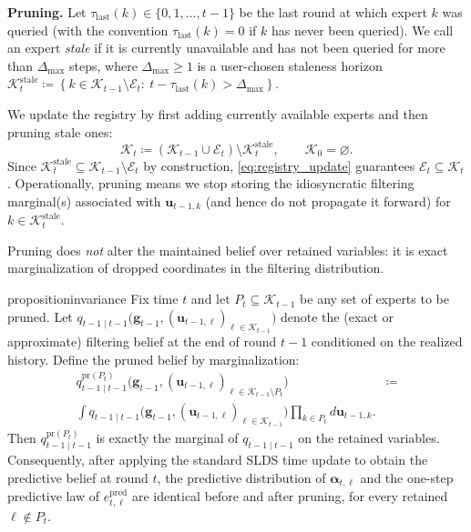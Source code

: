 \textbf{Pruning.}
Let \(\tau_{\mathrm{last}}(k)\in\{0,1,\dots,t-1\}\) be the last round at which expert \(k\) was queried
(with the convention \(\tau_{\mathrm{last}}(k)=0\) if \(k\) has never been queried).
We call an expert \emph{stale} if it is currently unavailable and has not been queried for more than
\(\Delta_{\max}\) steps, where \(\Delta_{\max}\ge 1\) is a user-chosen staleness horizon $\mathcal{K}^{\mathrm{stale}}_t
\coloneqq
\left\{k\in \mathcal{K}_{t-1}\setminus \mathcal{E}_t:\ t-\tau_{\mathrm{last}}(k)>\Delta_{\max}\right\}.$

We update the registry by first adding currently available experts and then pruning stale ones:
\begin{equation}
\label{eq:registry_update}
\mathcal{K}_t \coloneqq (\mathcal{K}_{t-1}\cup \mathcal{E}_t)\setminus \mathcal{K}^{\mathrm{stale}}_t,
\qquad \mathcal{K}_0=\varnothing .
\end{equation}
Since \(\mathcal{K}^{\mathrm{stale}}_t\subseteq \mathcal{K}_{t-1}\setminus \mathcal{E}_t\) by
construction, \eqref{eq:registry_update} guarantees \(\mathcal{E}_t\subseteq \mathcal{K}_t\).
Operationally, pruning means we stop storing the idiosyncratic filtering marginal(s) associated with
\(\mathbf{u}_{t-1,k}\) (and hence do not propagate it forward) for \(k\in\mathcal{K}^{\mathrm{stale}}_t\).

Pruning does \emph{not} alter the maintained belief over retained variables: it is exact
marginalization of dropped coordinates in the filtering distribution.

\begin{restatable}{proposition}{invariance}
\label{prop:invariance}
Fix time \(t\) and let \(P_t \subseteq \mathcal{K}_{t-1}\) be any set of experts to be pruned.
Let
\(
q_{t-1\mid t-1}\big(\mathbf{g}_{t-1},(\mathbf{u}_{t-1,\ell})_{\ell\in\mathcal{K}_{t-1}}\big)
\)
denote the (exact or approximate) filtering belief at the end of round \(t-1\) conditioned on the realized history.
Define the pruned belief by marginalization:
\begin{equation*}
    \begin{aligned}
        q^{\mathrm{pr}(P_t)}_{t-1\mid t-1}\big(\mathbf{g}_{t-1},(\mathbf{u}_{t-1,\ell})_{\ell\in\mathcal{K}_{t-1}\setminus P_t}\big)
& \coloneqq \\
\int q_{t-1\mid t-1}\big(\mathbf{g}_{t-1},(\mathbf{u}_{t-1,\ell})_{\ell\in\mathcal{K}_{t-1}}\big)
\prod_{k\in P_t} d\mathbf{u}_{t-1,k}.
    \end{aligned}
\end{equation*}
Then \(q^{\mathrm{pr}(P_t)}_{t-1\mid t-1}\) is exactly the marginal of \(q_{t-1\mid t-1}\) on the retained variables.
Consequently, after applying the standard SLDS time update to obtain the predictive belief at round \(t\),
the predictive distribution of \(\boldsymbol\alpha_{t,\ell}\) and the one-step predictive law of
\(e_{t,\ell}^{\mathrm{pred}}\) are identical before and after pruning, for every retained \(\ell\notin P_t\).
\end{restatable}

